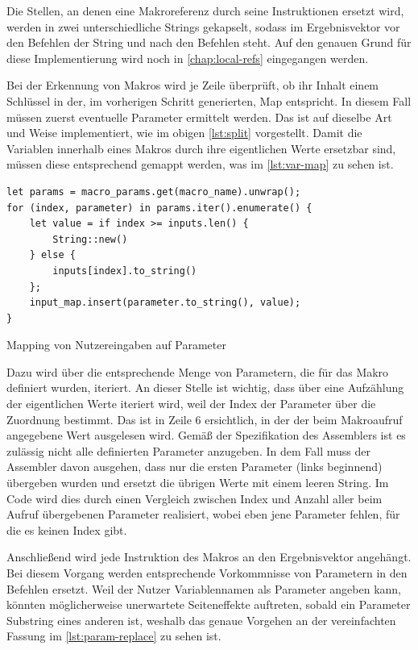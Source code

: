 Die Stellen, an denen eine Makroreferenz durch seine Instruktionen ersetzt wird, werden in zwei unterschiedliche Strings gekapselt, sodass im Ergebnisvektor vor den Befehlen der String  und nach den Befehlen  steht. Auf den genauen Grund für diese Implementierung wird noch in \ref{chap:local-refs} eingegangen werden.

Bei der Erkennung von Makros wird je Zeile überprüft, ob ihr Inhalt einem Schlüssel in der, im vorherigen Schritt generierten, Map entspricht. In diesem Fall müssen zuerst eventuelle Parameter ermittelt werden. Das ist auf dieselbe Art und Weise implementiert, wie im obigen \cref{lst:split} vorgestellt. Damit die Variablen innerhalb eines Makros durch ihre eigentlichen Werte ersetzbar sind, müssen diese entsprechend gemappt werden, was im \cref{lst:var-map} zu sehen ist.

\begin{listing}[th]
\begin{verbatim}
let params = macro_params.get(macro_name).unwrap();
for (index, parameter) in params.iter().enumerate() {
	let value = if index >= inputs.len() {
    	String::new()
    } else {
    	inputs[index].to_string()
    };
    input_map.insert(parameter.to_string(), value);
}
\end{verbatim}
\label{lst:var-map}
\caption{Mapping von Nutzereingaben auf Parameter}
\end{listing}

Dazu wird über die entsprechende Menge von Parametern, die für das Makro definiert wurden, iteriert. An dieser Stelle ist wichtig, dass über eine Aufzählung der eigentlichen Werte iteriert wird, weil der Index der Parameter über die Zuordnung bestimmt. Das ist in Zeile 6 ersichtlich, in der der beim Makroaufruf angegebene Wert ausgelesen wird. Gemäß der Spezifikation des Assemblers ist es zulässig nicht alle definierten Parameter anzugeben. In dem Fall muss der Assembler davon ausgehen, dass nur die ersten Parameter (links beginnend) übergeben wurden und ersetzt die übrigen Werte mit einem leeren String. Im Code wird dies durch einen Vergleich zwischen Index und Anzahl aller beim Aufruf übergebenen Parameter realisiert, wobei eben jene Parameter fehlen, für die es keinen Index gibt.

Anschließend wird jede Instruktion des Makros an den Ergebnisvektor angehängt. Bei diesem Vorgang werden entsprechende Vorkommnisse von Parametern in den Befehlen ersetzt. Weil der Nutzer Variablennamen als Parameter angeben kann, könnten möglicherweise unerwartete Seiteneffekte auftreten, sobald ein Parameter Substring eines anderen ist, weshalb das genaue Vorgehen an der vereinfachten Fassung im \cref{lst:param-replace} zu sehen ist.

